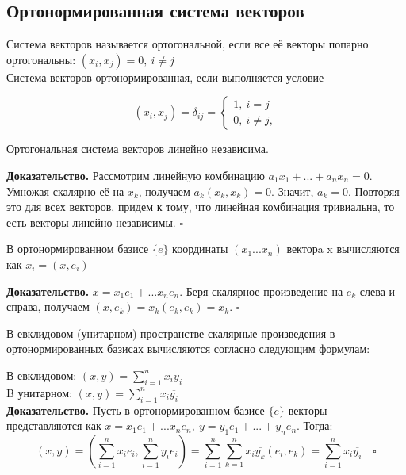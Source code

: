 \subsection{Ортонормированная система векторов}
\begin{defin}
Система векторов называется ортогональной, если все её векторы попарно 
ортогональны: $(x_i,x_j)=0,~i\ne j$\\
Система векторов ортонормированная, если выполняется условие
\end{defin}
$$(x_i,x_j)=\delta_{ij}=\begin{cases}1,~i=j\\0,~i\ne j,\end{cases}
$$
\begin{theor}
Ортогональная система векторов линейно независима.
\end{theor}
\textbf{Доказательство.} Рассмотрим линейную комбинацию $a_1x_1+...+a_nx_n=0$.
Умножая скалярно её на $x_k$, получаем $a_k(x_k,x_k)=0$. Значит, $a_k=0$. 
Повторяя это для всех векторов, придем к тому, что линейная комбинация 
тривиальна, то есть векторы линейно независимы. $\square$
\begin{theor}
В ортонормированном базисе $\{e\}$ координаты $(x_1...x_n)$ векторa x
вычисляются как $x_i=(x,e_i)$
\end{theor}
\textbf{Доказательство.} $x=x_1e_1+...x_ne_n$. Беря скалярное произведение на 
$e_k$ слева и справа, получаем $(x,e_k)=x_k(e_k,e_k)=x_k$. $\square$
\begin{theor}
В евклидовом (унитарном) пространстве скалярные произведения в 
ортонормированных базисах вычисляются согласно следующим формулам:
\end{theor}
В евклидовом: $(x,y)=\sum\limits^n_{i=1}x_iy_i$\\
B унитарном: $(x,y)=\sum\limits^n_{i=1}x_i\overline{y_i}$\\
\textbf{Доказательство.} Пусть в ортонормированном базисе $\{e\}$ векторы 
представляются как $x=x_1e_1+...x_ne_n,~y=y_1e_1+...+y_ne_n$. Тогда:
$$(x,y)=(\sum\limits^n_{i=1}x_ie_i,\sum\limits^n_{i=1}y_ie_i)=\sum\limits
^n_{i=1}\sum\limits^n_{k=1}x_i\overline{y_k}(e_i,e_k)=\sum\limits^n_{i=1}x_i
\overline{y_i}\quad\square$$

